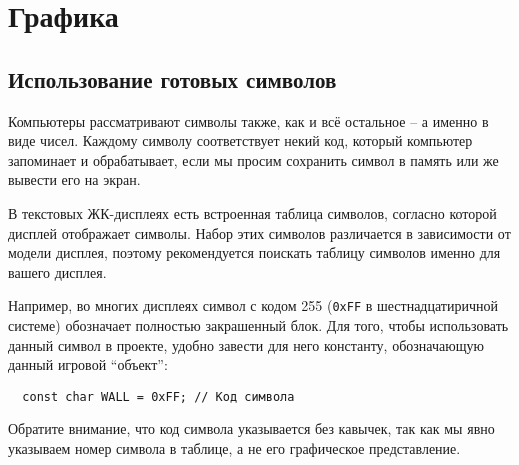 \documentclass[../sparc.tex]{subfiles}
\begin{document}
\section{Графика}

\subsection{Использование готовых символов}

Компьютеры рассматривают символы также, как и всё остальное -- а именно в виде
чисел.  Каждому символу соответствует некий код, который компьютер запоминает и
обрабатывает, если мы просим сохранить символ в память или же вывести его на
экран.


В текстовых ЖК-дисплеях есть встроенная таблица символов, согласно которой
дисплей отображает символы.  Набор этих символов различается в зависимости от
модели дисплея, поэтому рекомендуется поискать таблицу символов именно для
вашего дисплея.

Например, во многих дисплеях символ с кодом 255 (\texttt{0xFF} в
шестнадцатиричной системе) обозначает полностью закрашенный блок.  Для того,
чтобы использовать данный символ в проекте, удобно завести для него константу,
обозначающую данный игровой ``объект'':

\begin{verbatim}
  const char WALL = 0xFF; // Код символа
\end{verbatim}

Обратите внимание, что код символа указывается без кавычек, так как мы явно
указываем номер символа в таблице, а не его графическое представление.
\end{document}
